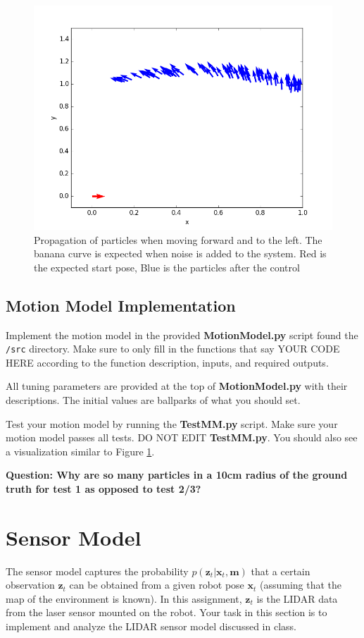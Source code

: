 \documentclass[final]{article}
\begin{document}
\begin{figure}[!htb]
\centering
\includegraphics[width=0.5\linewidth]{figs/motion_model.png}
\caption{Propagation of particles when moving forward and to the left. The banana curve is expected when noise is added to the system. Red is the expected start pose, Blue is the particles after the control}
\label{fig:motion_model}
\end{figure}
\subsection{Motion Model Implementation}
Implement the motion model in the provided \textbf{MotionModel.py} script found the \texttt{/src} directory. Make sure to only fill in the functions that say YOUR CODE HERE according to the function description, inputs, and required outputs.

All tuning parameters are provided at the top of \textbf{MotionModel.py} with their descriptions. The initial values are ballparks of what you should set.

Test your motion model by running the \textbf{TestMM.py} script. Make sure your motion model passes all tests. DO NOT EDIT \textbf{TestMM.py}. You should also see a visualization similar to Figure \ref{fig:motion_model}.

\textbf{Question: Why are so many particles in a 10cm radius of the ground truth for test 1 as opposed to test 2/3?}


\section{Sensor Model}

The sensor model captures the probability $p(\mathbf{z}_t | \mathbf{x}_t,\mathbf{m})$ that a certain observation $\mathbf{z}_t$ can be obtained from a given robot pose $\mathbf{x}_t$ (assuming that the map of the environment is known). In this assignment, $\mathbf{z}_t$ is the LIDAR data from the laser sensor mounted on the robot. Your task in this section is to implement and analyze the LIDAR sensor model discussed in class.
\end{document}
